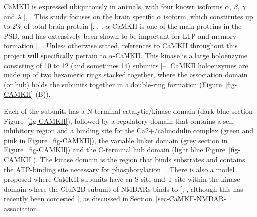 \documentclass[
  11pt,
  letterpaper,
]{scrreprt}
\begin{document}
CaMKII is expressed ubiquitously in animals, with four known isoforms
\(\alpha\), \(\beta\), \(\gamma\) and \(\lambda\)
{[},
\citeproc{ref-tullis2023Distinct}{157}{]}. This study focuses on the
brain specific \(\alpha\) isoform, which constitutes up to 2\% of total
brain protein {[},
,
\citeproc{ref-chen2005Mass}{159}{]}. \(\alpha\)-CaMKII is one of the
main proteins in the PSD, and has extensively been shown to be important
for LTP and memory formation {[},
\citeproc{ref-yasuda2022CaMKIIc}{161}{]}. Unless otherwise stated,
references to CaMKII throughout this project will specifically pertain
to \(\alpha\)-CaMKII. This kinase is a large holoenzyme consisting of 10
to 12 (and sometimes 14) subunits
{[}--\citeproc{ref-buonarati2021Conserved}{165}{]}.
CaMKII holoenzymes are made up of two hexameric rings stacked together,
where the association domain (or hub) holds the subunits together in a
double-ring formation (Figure~\ref{fig-CAMKII} (B)).

Each of the subunits has a N-terminal catalytic/kinase domain (dark blue
section Figure~\ref{fig-CAMKII}), followed by a regulatory domain that
contains a self-inhibitory region and a binding site for the
Ca2+/calmodulin complex (green and pink in Figure~\ref{fig-CAMKII}), the
variable linker domain (grey section in Figure~\ref{fig-CAMKII}) and the
C-terminal hub domain (light blue Figure~\ref{fig-CAMKII}). The kinase
domain is the region that binds substrates and contains the ATP-binding
site necessary for phosphorylation
{[}\citeproc{ref-pellicena2014CaMKII}{166}{]}. There is also a model
proposed where CaMKII subunits have an S-site and T-site within the
kinase domain where the GluN2B subunit of NMDARs binds to
{[},
\citeproc{ref-bayer2001Interaction}{168}{]}, although this has recently
been contested {[}\citeproc{ref-ozden2022CaMKII}{169}{]}, as discussed
in Section~\ref{sec-CaMKII-NMDAR-association}.
\end{document}
